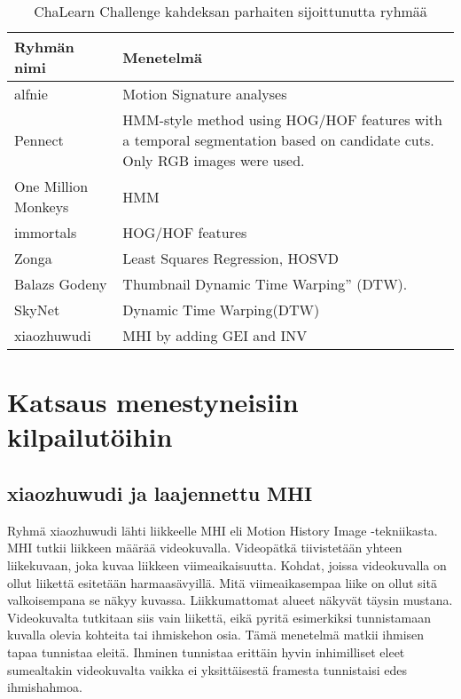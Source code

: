 \begin{table}[th]
\caption{ChaLearn Challenge kahdeksan parhaiten sijoittunutta ryhmää}
\label{table:dvbt_param}
\begin{center}
\begin{tabular}{|p{}|p{}|} 
    \hline
Ryhmän nimi & Menetelmä \\
    \hline
    \hline
alfnie & Motion Signature analyses\\ 
    \hline
Pennect & HMM-style method using HOG/HOF features
with a temporal segmentation based on candidate cuts.
Only RGB images were used.\\
    \hline
One Million Monkeys & HMM\\
    \hline
immortals & HOG/HOF features\\
    \hline
Zonga & Least Squares Regression, HOSVD\\
    \hline
Balazs Godeny & Thumbnail Dynamic Time Warping” (DTW).\\
    \hline
SkyNet & Dynamic Time Warping(DTW)\\
    \hline
xiaozhuwudi & MHI by adding GEI and INV\\
    \hline	
\end{tabular}
\end{center}
\end{table}

\newpage

\section {Katsaus menestyneisiin kilpailutöihin}

\subsection{xiaozhuwudi ja laajennettu MHI}
Ryhmä xiaozhuwudi lähti liikkeelle MHI eli Motion History Image -tekniikasta. MHI tutkii liikkeen määrää videokuvalla.
Videopätkä tiivistetään yhteen liikekuvaan, joka kuvaa liikkeen viimeaikaisuutta. Kohdat, joissa videokuvalla on ollut
liikettä esitetään harmaasävyillä. Mitä viimeaikasempaa liike on ollut sitä valkoisempana se näkyy kuvassa. Liikkumattomat
alueet näkyvät täysin mustana. Videokuvalta tutkitaan siis vain liikettä, eikä pyritä esimerkiksi tunnistamaan kuvalla olevia kohteita
tai ihmiskehon osia. Tämä menetelmä matkii ihmisen tapaa tunnistaa eleitä. Ihminen tunnistaa erittäin hyvin inhimilliset eleet  
sumealtakin videokuvalta vaikka ei yksittäisestä framesta tunnistaisi edes ihmishahmoa.  \\

